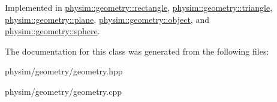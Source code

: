 Implemented in \hyperlink{classphysim_1_1geometry_1_1rectangle_a85054e17383f27439fb936302558e8e9}{physim\+::geometry\+::rectangle}, \hyperlink{classphysim_1_1geometry_1_1triangle_a138bc267ef333128534651fa6f20ff2a}{physim\+::geometry\+::triangle}, \hyperlink{classphysim_1_1geometry_1_1plane_a9d72fc86446a0bcb46bfb344f40621ff}{physim\+::geometry\+::plane}, \hyperlink{classphysim_1_1geometry_1_1object_a4604a2f28509e8a1d10bf7bb4a2a66db}{physim\+::geometry\+::object}, and \hyperlink{classphysim_1_1geometry_1_1sphere_a68ebd59275ca9d6621fe94cd0cd3a502}{physim\+::geometry\+::sphere}.



The documentation for this class was generated from the following files\+:\begin{DoxyCompactItemize}
\item 
physim/geometry/geometry.\+hpp\item 
physim/geometry/geometry.\+cpp\end{DoxyCompactItemize}
